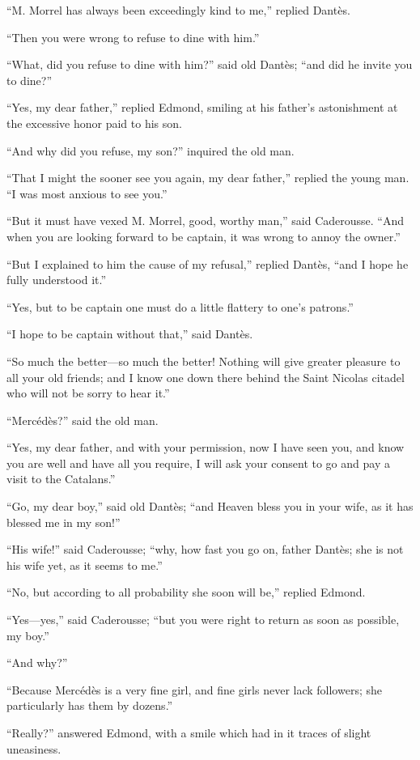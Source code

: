 “M. Morrel has always been exceedingly kind to me,” replied Dantès.

“Then you were wrong to refuse to dine with him.”

“What, did you refuse to dine with him?” said old Dantès; “and did he
invite you to dine?”

“Yes, my dear father,” replied Edmond, smiling at his father’s
astonishment at the excessive honor paid to his son.

“And why did you refuse, my son?” inquired the old man.

“That I might the sooner see you again, my dear father,” replied the
young man. “I was most anxious to see you.”

“But it must have vexed M. Morrel, good, worthy man,” said Caderousse.
“And when you are looking forward to be captain, it was wrong to annoy
the owner.”

“But I explained to him the cause of my refusal,” replied Dantès, “and
I hope he fully understood it.”

“Yes, but to be captain one must do a little flattery to one’s
patrons.”

“I hope to be captain without that,” said Dantès.

“So much the better—so much the better! Nothing will give greater
pleasure to all your old friends; and I know one down there behind the
Saint Nicolas citadel who will not be sorry to hear it.”

“Mercédès?” said the old man.

“Yes, my dear father, and with your permission, now I have seen you,
and know you are well and have all you require, I will ask your consent
to go and pay a visit to the Catalans.”

“Go, my dear boy,” said old Dantès; “and Heaven bless you in your wife,
as it has blessed me in my son!”

“His wife!” said Caderousse; “why, how fast you go on, father Dantès;
she is not his wife yet, as it seems to me.”

“No, but according to all probability she soon will be,” replied
Edmond.

“Yes—yes,” said Caderousse; “but you were right to return as soon as
possible, my boy.”

“And why?”

“Because Mercédès is a very fine girl, and fine girls never lack
followers; she particularly has them by dozens.”

“Really?” answered Edmond, with a smile which had in it traces of
slight uneasiness.

